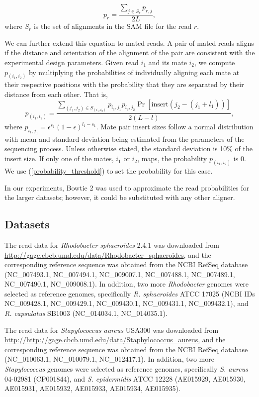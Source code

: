 \documentclass[12pt,\mydriver]{thesis}
\begin{document}
\begin{equation}
\label{}
p_{r} = \frac{\sum_{j \in S_r} p_{r,j}}{2L},
\end{equation}
where $S_r$ is the set of alignments in the SAM file for the read $r$.

We can further extend this equation to mated reads.  A pair of mated
reads aligns if the distance and orientation of the alignment of the
pair are consistent with the experimental design parameters.  Given
read $i_1$ and its mate $i_2$, we compute $p_{(i_1,i_2)}$ by
multiplying the probabilities of individually aligning each mate at
their respective positions with the probability that they are
separated by their distance from each other. That is,
\begin{equation}
\label{mate_pair_prob}
p_{(i_1,i_2)} = \frac{\sum_{(j_1,j_2) \in S_{(i_1,i_2)}} p_{i_1,j_1} p_{i_2,j_2} \Pr[\textrm{insert}(j_2 - (j_1 + l_1))]}{2(L - l)},
\end{equation}
where $p_{i_1, j_1} = \epsilon^{s_1}(1 - \epsilon)^{l_1 - s_1}$.  Mate
pair insert sizes follow a normal distribution with mean and
standard deviation being estimated from the parameters of the sequencing process.  Unless otherwise stated, the standard deviation is 10\%
of the insert size.  If only one of the mates, $i_1$ or $i_2$, maps,
the probability $p_{(i_1,i_2)}$ is $0$. We use (\ref{probability_threshold}) to set the probability for this case.

In our experiments, Bowtie 2 was used to approximate the read
probabilities for the larger datasets; however, it could be substituted with any other aligner.


\subsection{Datasets}

The read data for \emph{Rhodobacter sphaeroides} 2.4.1 was downloaded from \url{
http://gage.cbcb.umd.edu/data/Rhodobacter_sphaeroides}, and the
corresponding reference sequence was obtained from the NCBI RefSeq database (NC\_007493.1, NC\_007494.1, NC\_009007.1, NC\_007488.1,
NC\_007489.1, NC\_007490.1, NC\_009008.1).
In addition, two more \emph{Rhodobacter} genomes were selected as
reference genomes, specifically \emph{R. sphaeroides} ATCC 17025 (NCBI
IDs NC\_009428.1, NC\_009429.1, NC\_009430.1, NC\_009431.1,
NC\_009432.1), and \emph{R. capsulatus} SB1003 (NC\_014034.1,
NC\_014035.1).

The read data for \emph{Stapylococcus aureus} USA300 was downloaded from \url{
http://http://gage.cbcb.umd.edu/data/Staphylococcus_aureus}, and the
corresponding reference sequence was obtained from the NCBI RefSeq database (NC\_010063.1, NC\_010079.1, NC\_012417.1).
In addition, two more \emph{Stapylococcus} genomes were selected as
reference genomes, specifically \emph{S. aureus} 04-02981 (CP001844), and \emph{S. epidermidis} ATCC 12228 (AE015929, AE015930,
AE015931, AE015932, AE015933, AE015934, AE015935).
\end{document}
